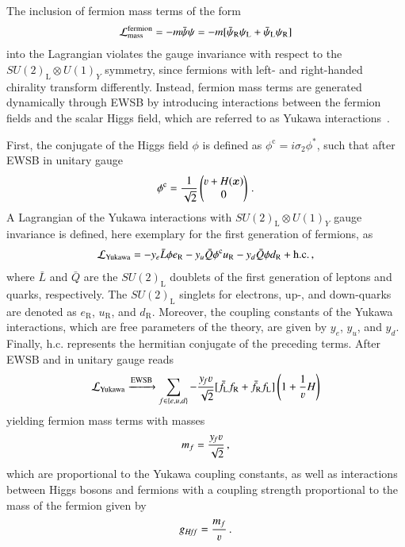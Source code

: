 The inclusion of fermion mass terms of the form
\begin{align*}
  \mathcal{L}_{\text{mass}}^{\text{fermion}} = - m \bar{\psi} \psi = - m [ \bar{\psi}_\text{R} \psi_\text{L} + \bar{\psi}_\text{L} \psi_\text{R} ]
\end{align*}
into the Lagrangian violates the gauge invariance with respect to the
$SU(2)_{\text{L}} \otimes U(1)_Y$ symmetry, since fermions with left- and
right-handed chirality transform differently. Instead, fermion mass terms are
generated dynamically through EWSB by introducing interactions between the
fermion fields and the scalar Higgs field, which are referred to as Yukawa
interactions~\cite{Yukawa:1935xg}.

First, the conjugate of the Higgs field $\phi$ is defined as
$\phi^{\text{c}} = i \sigma_2 \phi^*$, such that after EWSB in unitary gauge
\begin{align*}
  \phi^{\text{c}} = \frac{1}{\sqrt{2}}
  \begin{pmatrix}
    \varv + H(\myvec{x}) \\
    0
  \end{pmatrix} \,\text{.}
\end{align*}
A Lagrangian of the Yukawa interactions with $SU(2)_{\text{L}} \otimes U(1)_Y$
gauge invariance is defined, here exemplary for the first generation of
fermions, as
\begin{align}
  \mathcal{L}_{\text{Yukawa}} =
  - y_e \bar{L} \phi e_{\text{R}}
  - y_u \bar{Q} \phi^{\text{c}} u_{\text{R}}
  - y_d \bar{Q} \phi d_{\text{R}}
  + \text{h.c.} \,\text{,}
  \label{eq:lagrangian_yukawa}
\end{align}
where $\bar{L}$ and $\bar{Q}$ are the $SU(2)_{\text{L}}$ doublets of the first
generation of leptons and quarks, respectively. The $SU(2)_{\text{L}}$ singlets
for electrons, up-, and down-quarks are denoted as $e_{\text{R}}$,
$u_{\text{R}}$, and $d_{\text{R}}$. Moreover, the coupling constants of the
Yukawa interactions, which are free parameters of the theory, are given by
$y_e$, $y_u$, and $y_d$. Finally, $\text{h.c.}$ represents the hermitian
conjugate of the preceding terms. After EWSB and in unitary gauge
 reads
\begin{align*}
  \lagrange_{\text{Yukawa}} \xrightarrow{\text{EWSB}} \sum_{f \in \{e, u, d\}} -\frac{y_{\hspace{-0.1em}f} \varv}{\sqrt{2}} [ \bar{f}_{\text{L}} f_{\text{R}} + \bar{f}_{\text{R}} f_{\text{L}} ] \left( 1 + \frac{1}{\varv} H \right)
\end{align*}
yielding fermion mass terms with masses
\begin{align*}
  m_{f} = \frac{y_{\hspace{-0.1em}f} \varv}{\sqrt{2}} \,\text{,}
\end{align*}
which are proportional to the Yukawa coupling constants, as well as interactions
between Higgs bosons and fermions with a coupling strength proportional to the
mass of the fermion given by
\begin{align*}
  g_{H\!f\!f} = \frac{m_f}{\varv} \,\text{.}
\end{align*}

